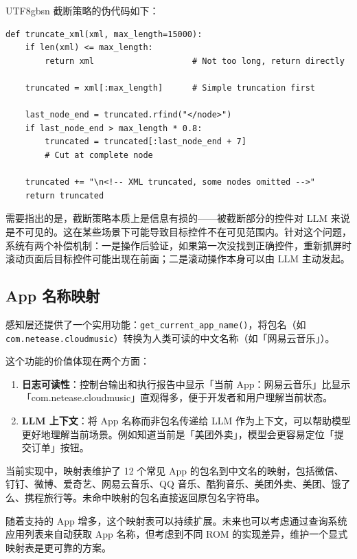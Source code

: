 \documentclass{article}
\begin{document}
\begin{CJK}{UTF8}{gbsn}
截断策略的伪代码如下：

\begin{verbatim}
def truncate_xml(xml, max_length=15000):
    if len(xml) <= max_length:
        return xml                    # Not too long, return directly
    
    truncated = xml[:max_length]      # Simple truncation first
    
    last_node_end = truncated.rfind("</node>")
    if last_node_end > max_length * 0.8:
        truncated = truncated[:last_node_end + 7]   
        # Cut at complete node
    
    truncated += "\n<!-- XML truncated, some nodes omitted -->"
    return truncated
\end{verbatim}

需要指出的是，截断策略本质上是信息有损的——被截断部分的控件对 LLM 来说是不可见的。这在某些场景下可能导致目标控件不在可见范围内。针对这个问题，系统有两个补偿机制：一是操作后验证，如果第一次没找到正确控件，重新抓屏时滚动页面后目标控件可能出现在前面；二是滚动操作本身可以由 LLM 主动发起。

\subsection{App 名称映射}

感知层还提供了一个实用功能：\texttt{get\_current\_app\_name()}，将包名（如 \texttt{com.netease.cloudmusic}）转换为人类可读的中文名称（如「网易云音乐」）。

这个功能的价值体现在两个方面：

\begin{enumerate}[leftmargin=1.5em]
  \item \textbf{日志可读性}：控制台输出和执行报告中显示「当前 App：网易云音乐」比显示「com.netease.cloudmusic」直观得多，便于开发者和用户理解当前状态。
  \item \textbf{LLM 上下文}：将 App 名称而非包名传递给 LLM 作为上下文，可以帮助模型更好地理解当前场景。例如知道当前是「美团外卖」，模型会更容易定位「提交订单」按钮。
\end{enumerate}

当前实现中，映射表维护了 12 个常见 App 的包名到中文名的映射，包括微信、钉钉、微博、爱奇艺、网易云音乐、QQ 音乐、酷狗音乐、美团外卖、美团、饿了么、携程旅行等。未命中映射的包名直接返回原包名字符串。

随着支持的 App 增多，这个映射表可以持续扩展。未来也可以考虑通过查询系统应用列表来自动获取 App 名称，但考虑到不同 ROM 的实现差异，维护一个显式映射表是更可靠的方案。


\end{CJK}
\end{document}
